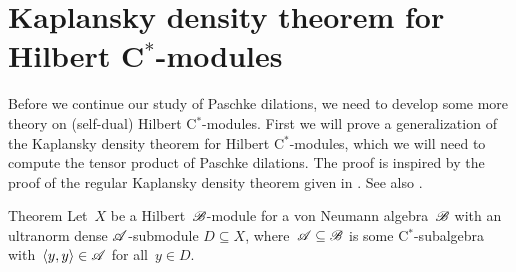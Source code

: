 \section{Kaplansky density theorem for Hilbert C$^*$-modules}
\begin{parsec}%
\begin{point}%
Before we continue our study of Paschke dilations,
    we need to develop some more theory on (self-dual) Hilbert C$^*$-modules.
First we will prove a generalization of the Kaplansky density
    theorem for Hilbert C$^*$-modules,
    which we will need to compute the tensor product of Paschke dilations.
The proof is inspired by the proof of the regular Kaplansky density theorem
    given in \cite[Thm.~1.2.2]{arveson2012invitation}.
See also .
\end{point}
\begin{point}{Theorem}%
Let~$X$ be a Hilbert~$\mathscr{B}$-module for a von Neumann algebra~$\mathscr{B}$
    with an ultranorm dense $\mathscr{A}$-submodule $D \subseteq X$,
    where~$\mathscr{A} \subseteq \mathscr{B}$ is some C$^*$-subalgebra
    with~$\langle y,y \rangle \in \mathscr{A}$ for all~$y \in D$.


\end{point}
\end{parsec}
